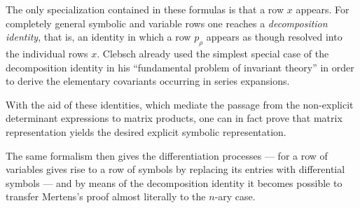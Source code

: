 \documentclass[11pt]{article}
\begin{document}
The only specialization contained in these formulas is that a row $x$ appears. For completely general symbolic and variable rows one reaches a \emph{decomposition identity}, that is, an identity in which a row $p_\rho$ appears as though resolved into the individual rows $x$. Clebsch already used the simplest special case of the decomposition identity in his ``fundamental problem of invariant theory'' in order to derive the elementary covariants occurring in series expansions.

With the aid of these identities, which mediate the passage from the non-explicit determinant expressions to matrix products, one can in fact prove that matrix representation yields the desired explicit symbolic representation.

The same formalism then gives the differentiation processes --- for a row of variables gives rise to a row of symbols by replacing its entries with differential symbols --- and by means of the decomposition identity it becomes possible to transfer Mertens's proof almost literally to the $n$-ary case.
\end{document}
